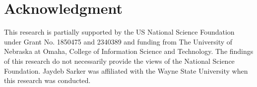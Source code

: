 \section*{Acknowledgment}
\label{sec:acknowledgment}
This research is partially supported by the US National Science Foundation under Grant No. 
1850475 and 2340389 and funding from The University of Nebraska at Omaha, College of Information Science and Technology. 
The findings of this research do not necessarily provide the views of the National Science Foundation.
Jaydeb Sarker was affiliated with the Wayne State University when this research was conducted. 
 

